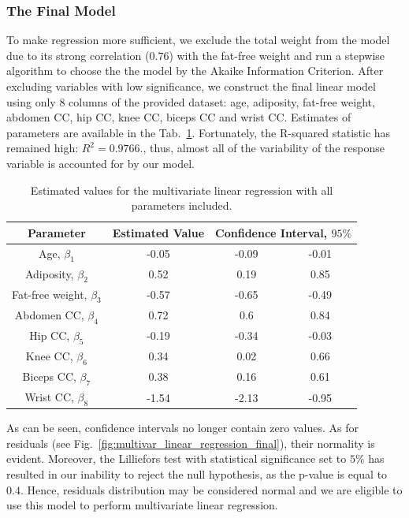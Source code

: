 \documentclass[11pt,american,american]{article}
\begin{document}
\subsubsection{The Final Model}

To make regression more sufficient, we exclude the total weight from the model due to its strong correlation ($0.76$) with the fat-free weight and run a stepwise algorithm to choose the the model by the Akaike Information Criterion. After excluding variables with low significance, we construct the final linear model using only  $8$ columns of the provided dataset: age, adiposity, fat-free weight, abdomen CC, hip CC, knee CC, biceps CC and wrist CC. Estimates of parameters are available in the Tab.~\ref{tab:multivar_regression_final}. Fortunately, the R-squared statistic has remained high: $R^{2} = 0.9766$., thus, almost all of the variability of the response variable is accounted for by our model.

\begin{table}[H]
	\centering
	\begin{tabular}{|c||c||c|c|}
		\hline 
		Parameter &  Estimated Value & \multicolumn{2}{c|}{Confidence Interval, $95\%$}  \\ 
		\hline \hline 
		Age, $\beta_{1}$ & -0.05 & -0.09 &  -0.01 \\ 
		\hline 
		Adiposity, $\beta_{2}$ & 0.52 & 0.19 & 0.85  \\
		\hline 
		Fat-free weight, $\beta_{3}$ & -0.57 & -0.65 & -0.49  \\
		\hline
		Abdomen CC, $\beta_{4}$ & 0.72 & 0.6 & 0.84  \\
		\hline
		Hip CC, $\beta_{5}$ & -0.19 & -0.34 & -0.03  \\
		\hline
		Knee CC, $\beta_{6}$ & 0.34 & 0.02 & 0.66  \\
		\hline
		Biceps CC, $\beta_{7}$ & 0.38 & 0.16 & 0.61  \\
		\hline
		Wrist CC, $\beta_{8}$ & -1.54 & -2.13 & -0.95  \\
		\hline
	\end{tabular} 
	\caption{Estimated values for the multivariate linear regression with all parameters included.}
	\label{tab:multivar_regression_final}
\end{table}

\medskip

As can be seen, confidence intervals no longer contain zero values. As for residuals (see Fig.~\ref{fig:multivar_linear_regression_final}), their normality is evident. Moreover, the Lilliefors test with statistical significance set to $5\%$ has resulted in our inability to reject the null hypothesis, as the p-value is equal to $0.4$. Hence, residuals distribution may be considered normal and we are eligible to use this model to perform multivariate linear regression.
\end{document}
